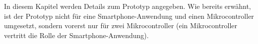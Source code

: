 In diesem Kapitel werden Details zum Prototyp angegeben. Wie bereits erwähnt, ist der Prototyp nicht für eine Smartphone-Anwendung und einen Mikrocontroller umgesetzt, sondern vorerst nur für zwei Mikrocontroller (ein Mikrocontroller vertritt die Rolle der Smartphone-Anwendung).